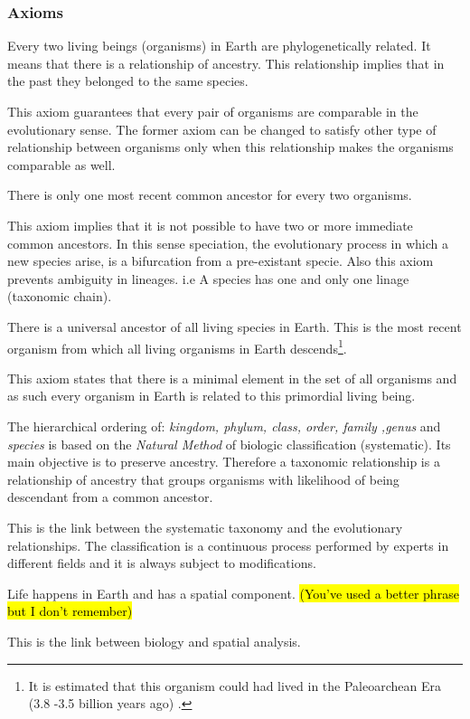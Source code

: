 \subsubsection{Axioms}

\begin{axiom}
Every two living beings (organisms) in Earth are phylogenetically related. It means that there is a relationship of ancestry. This relationship implies that in the past they belonged to the same species.
\end{axiom}
This axiom guarantees that every pair of organisms are comparable in the evolutionary sense. The former axiom can be changed to satisfy other type of relationship between organisms only when this relationship makes the organisms comparable as well.  

\begin{axiom}
There is only one most recent common ancestor for every two organisms.
\end{axiom}
This axiom implies that it is not possible to have two or more immediate common ancestors. In this sense speciation, the evolutionary process in which a new species arise, is a bifurcation from a pre-existant specie. Also this axiom prevents ambiguity in lineages. i.e A species has one and only one linage (taxonomic chain).
   
\begin{axiom}
There is a universal ancestor of all living species in Earth. This is the most recent organism from which all living organisms in Earth descends\footnote{ It is estimated that this organism could had lived in the Paleoarchean Era (3.8 -3.5 billion years ago) \citep{Glansdorff-2008}.}.
\end{axiom}
This axiom states that there is a minimal element in the set of all organisms and as such every organism in Earth is related to this primordial living being.
 
\begin{axiom} 
The hierarchical ordering of: {\em kingdom, phylum, class, order, family ,genus} and {\em species} is based on the {\em Natural Method} of biologic classification (systematic). Its main objective is to preserve ancestry. Therefore a taxonomic relationship is a relationship of ancestry that groups organisms with likelihood of being descendant from a common ancestor.
\end{axiom}
 This is the link between the systematic taxonomy and the evolutionary relationships. The classification is a continuous process performed by experts in different fields and it is always subject to modifications.
\begin{axiom}
Life happens in Earth and has a spatial component. \hl{(You've used a better phrase but I don't remember)}
\end{axiom}
This is the link between biology and spatial analysis.

